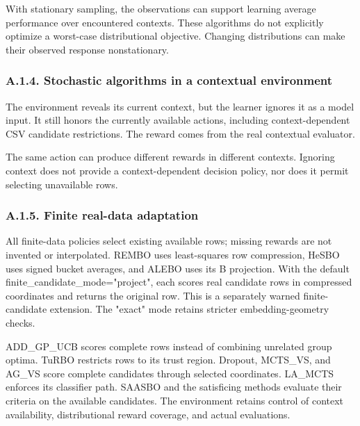 \documentclass[10pt,a4paper]{article}
\begin{document}
With stationary sampling,\allowbreak{} the observations can support learning average performance over encountered contexts. These algorithms do not explicitly optimize a worst-case distributional objective. Changing distributions can make their observed response nonstationary.


\subsubsection*{A.1.4. Stochastic algorithms in a contextual environment}

The environment reveals its current context,\allowbreak{} but the learner ignores it as a model input. It still honors the currently available actions,\allowbreak{} including context-dependent CSV candidate restrictions. The reward comes from the real contextual evaluator.


The same action can produce different rewards in different contexts. Ignoring context does not provide a context-dependent decision policy,\allowbreak{} nor does it permit selecting unavailable rows.


\subsubsection*{A.1.5. Finite real-data adaptation}

All finite-data policies select existing available rows; missing rewards are not invented or interpolated. REMBO uses least-squares row compression,\allowbreak{} HeSBO uses signed bucket averages,\allowbreak{} and ALEBO uses its B projection. With the default finite\_\allowbreak{}candidate\_\allowbreak{}mode="project",\allowbreak{} each scores real candidate rows in compressed coordinates and returns the original row. This is a separately warned finite-candidate extension. The "exact" mode retains stricter embedding-geometry checks.


ADD\_\allowbreak{}GP\_\allowbreak{}UCB scores complete rows instead of combining unrelated group optima. TuRBO restricts rows to its trust region. Dropout,\allowbreak{} MCTS\_\allowbreak{}VS,\allowbreak{} and AG\_\allowbreak{}VS score complete candidates through selected coordinates. LA\_\allowbreak{}MCTS enforces its classifier path. SAASBO and the satisficing methods evaluate their criteria on the available candidates. The environment retains control of context availability,\allowbreak{} distributional reward coverage,\allowbreak{} and actual evaluations.
\end{document}
